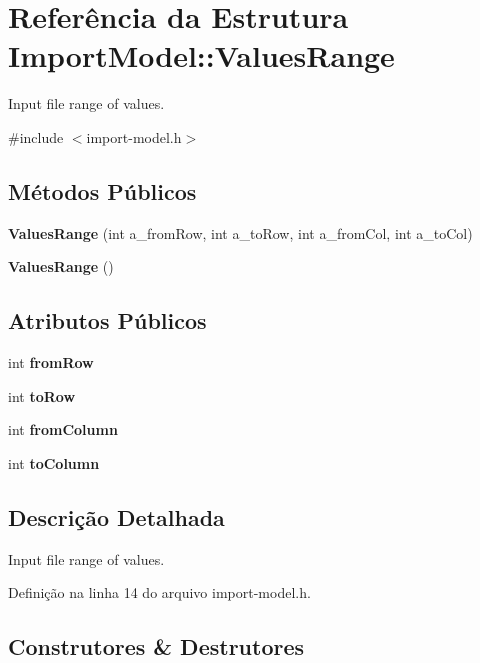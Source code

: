\section{Referência da Estrutura Import\+Model\+:\+:Values\+Range}
\label{struct_import_model_1_1_values_range}


Input file range of values.  




{\ttfamily \#include $<$import-\/model.\+h$>$}

\subsection*{Métodos Públicos}
\begin{DoxyCompactItemize}
\item 
{\bf Values\+Range} (int a\+\_\+from\+Row, int a\+\_\+to\+Row, int a\+\_\+from\+Col, int a\+\_\+to\+Col)
\item 
{\bf Values\+Range} ()
\end{DoxyCompactItemize}
\subsection*{Atributos Públicos}
\begin{DoxyCompactItemize}
\item 
int {\bf from\+Row}
\item 
int {\bf to\+Row}
\item 
int {\bf from\+Column}
\item 
int {\bf to\+Column}
\end{DoxyCompactItemize}


\subsection{Descrição Detalhada}
Input file range of values. 

Definição na linha 14 do arquivo import-\/model.\+h.



\subsection{Construtores \& Destrutores}
